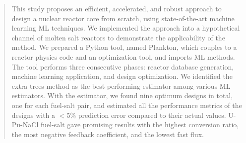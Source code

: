 \begin{abstract}

This study proposes an efficient, accelerated, and robust approach to design a nuclear reactor core from scratch, using state-of-the-art machine learning \gls{ML} techniques. We implemented the approach into a hypothetical channel of molten salt reactors to demonstrate the applicability of the method. We prepared a Python tool, named Plankton, which couples to a reactor physics code and an optimization tool, and imports \gls{ML} methods. The tool performs three consecutive phases: reactor database generation, machine learning application, and design optimization. We identified the extra trees method as the best performing estimator among various \gls{ML} estimators. With the estimator, we found nine optimum designs in total, one for each fuel-salt pair, and estimated all the performance metrics of the designs with a $<$5\% prediction error compared to their actual values. U-Pu-NaCl fuel-salt gave promising results with the highest conversion ratio, the most negative feedback coefficient, and the lowest fast flux.

\end{abstract}
